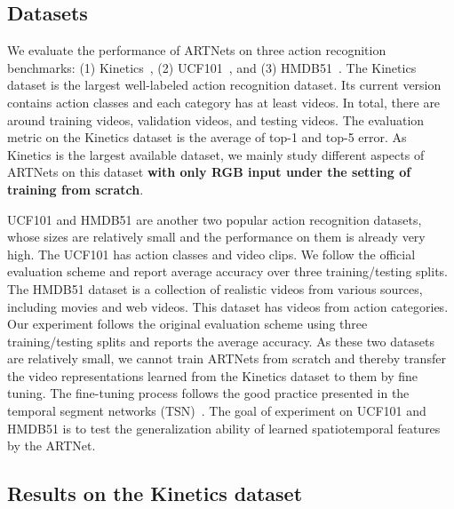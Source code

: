 \documentclass[10pt,twocolumn,letterpaper]{article}
\begin{document}
\subsection{Datasets}

We evaluate the performance of ARTNets on three action recognition benchmarks: (1) Kinetics~\cite{KayCSZHVVGBNSZ17}, (2) UCF101~\cite{Soomro12}, and (3) HMDB51~\cite{KuehneJGPS11}. The Kinetics dataset is the largest well-labeled action recognition dataset. Its current version contains  action classes and each category has at least  videos. In total, there are around  training videos,  validation videos, and  testing videos. The evaluation metric on the Kinetics dataset is the average of top-1 and top-5 error. As Kinetics is the largest available dataset, we mainly study different aspects of ARTNets on this dataset {\bf with only RGB input under the setting of training from scratch}.

UCF101 and HMDB51 are another two popular action recognition datasets, whose sizes are relatively small and the performance on them is already very high. The UCF101 has  action classes and  video clips. We follow the official evaluation scheme and report average accuracy over three training/testing splits. The HMDB51 dataset is a collection of realistic videos from various sources, including movies and web videos. This dataset has  videos from  action categories. Our experiment follows the original evaluation scheme using three training/testing splits and reports the average accuracy. As these two datasets are relatively small, we cannot train ARTNets from scratch and thereby transfer the video representations learned from the Kinetics dataset to them by fine tuning. The fine-tuning process follows the good practice presented in the temporal segment networks (TSN)~\cite{WangXWQLTV16}. The goal of experiment on UCF101 and HMDB51 is to test the generalization ability of learned spatiotemporal features by the ARTNet. 

\subsection{Results on the Kinetics dataset}
\end{document}
